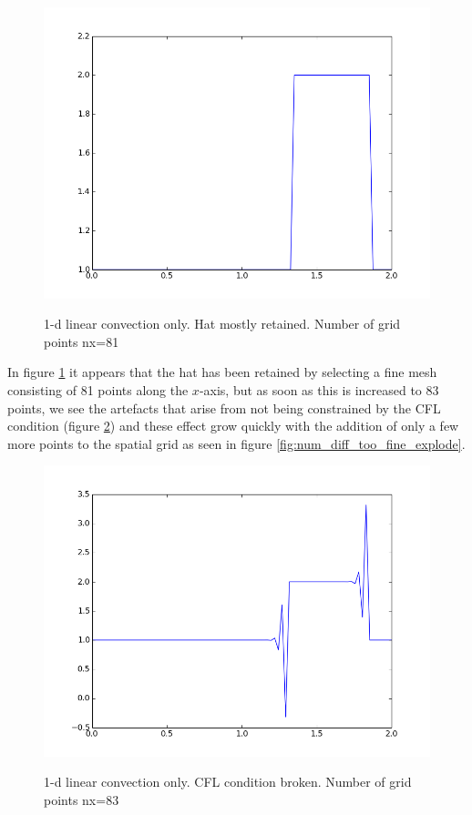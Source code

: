 \documentclass[11pt]{article}
\begin{document}
{	\begin{figure}[H]
	\centering
	\caption{1-d linear convection only. Hat mostly retained. Number of grid points nx=81}
	\includegraphics[scale=0.8]{keep_hat.png}
	\label{fig:num_diff_finest_mesh}
	\end{figure}

In figure \ref{fig:num_diff_finest_mesh} it appears that the hat has been retained by selecting
a fine mesh consisting of 81 points along the $x$-axis, but as soon as this is increased to
83 points, we see the artefacts that arise from not being constrained by the CFL condition
(figure \ref{fig:num_diff_too_fine}) and these effect grow quickly with the addition of only
a few more points to the spatial grid as seen in figure \ref{fig:num_diff_too_fine_explode}.

	\begin{figure}[H]
	\centering
	\caption{1-d linear convection only. CFL condition broken. Number of grid points nx=83}
	\includegraphics[scale=0.8]{cfl_broke.png}
	\label{fig:num_diff_too_fine}
	\end{figure}

}
\end{document}
